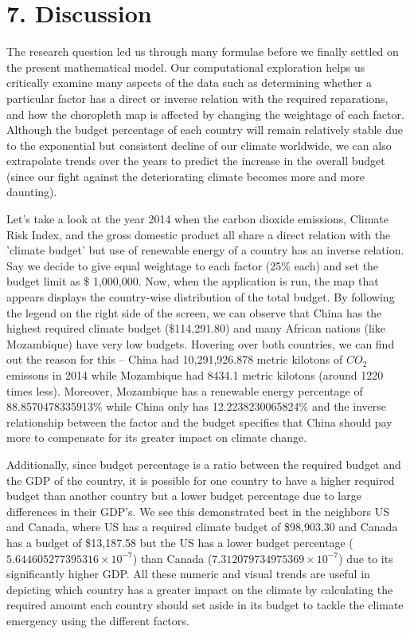 \documentclass[fontsize=11pt]{article}
\begin{document}
    \section*{7. Discussion}
    \quad The research question led us through many formulae before we finally settled on the present mathematical model. 
    Our computational exploration helps us critically examine many aspects of the data such as determining whether a particular factor 
    has a direct or inverse relation with the required reparations, and how the choropleth map is affected by changing the weightage of each factor. 
    Although the budget percentage of each country will remain relatively stable due to the exponential but consistent decline of our climate worldwide, 
    we can also extrapolate trends over the years to predict the increase in the overall budget (since our fight against the deteriorating climate 
    becomes more and more daunting).
    \newline
    
    Let's take a look at the year 2014 when the carbon dioxide emissions, Climate Risk Index, and the gross domestic product all share 
    a direct relation with the 'climate budget' but use of renewable energy of a country has an inverse relation. Say we decide to give 
    equal weightage to each factor (25\% each) and set the budget limit as \$ 1,000,000. Now, when the application is run, the map that 
    appears displays the country-wise distribution of the total budget. By following the legend on the right side of the screen, we can 
    observe that China has the highest required climate budget (\$114,291.80) and many African nations (like Mozambique) have very low 
    budgets. Hovering over both countries, we can find out the reason for this -- China had 10,291,926.878 metric kilotons of $CO_2$ emissons 
    in 2014 while Mozambique had 8434.1 metric kilotons (around 1220 times less). Moreover, Mozambique has a renewable energy percentage 
    of 88.8570478335913\% while China only has 12.2238230065824\% and the inverse relationship between the factor and the budget 
    specifies that China should pay more to compensate for its greater impact on climate change.
    \newline
    
    Additionally, since budget percentage is a ratio between the required budget and the GDP of the country, it is possible for one 
    country to have a higher required budget than another country but a lower budget percentage due to large differences in their GDP's. 
    We see this demonstrated best in the neighbors US and Canada, where US has a required climate budget of \$98,903.30 and Canada has a 
    budget of \$13,187.58 but the US has a lower budget percentage ($5.644605277395316 \times 10^{-7}$) than Canada 
    ($7.312079734975369 \times 10^{-7}$) due to its significantly higher GDP. All these numeric and visual trends are useful in depicting 
    which country has a greater impact on the climate by calculating the required amount each country should set aside in its budget to 
    tackle the climate emergency using the different factors. 
    \newline
    
\end{document}
